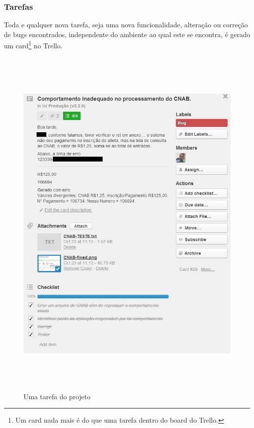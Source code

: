 \documentclass[11pt, a4paper]{article}
\begin{document}
\subsubsection{Tarefas}

Toda e qualquer nova tarefa, seja uma nova funcionalidade, alteração ou correção de bugs encontrados, independente do ambiente ao qual este se encontra, é gerado um card\footnote{Um card nada mais é do que uma tarefa dentro do board do Trello.} no Trello.

\begin{figure}[H]
  \caption{Uma tarefa do projeto}
  \centering 
  \includegraphics[width=150mm,height=180mm]{images/card.png}
\end{figure}
\end{document}
